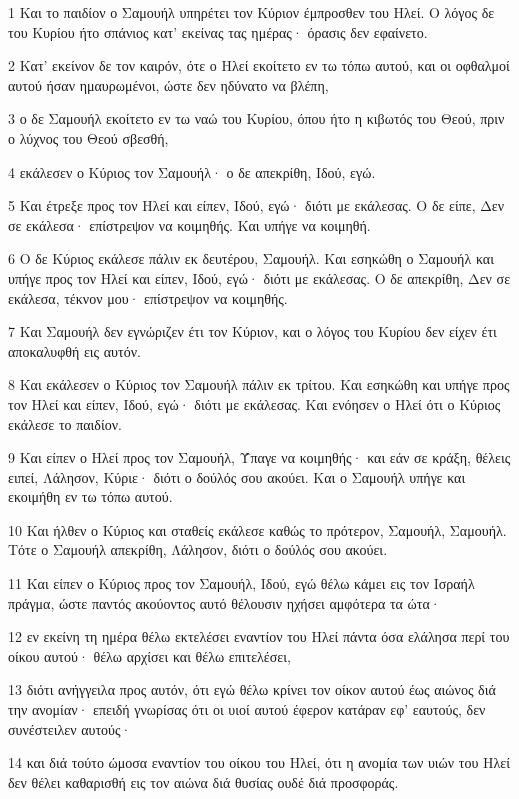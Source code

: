 \par 1 Και το παιδίον ο Σαμουήλ υπηρέτει τον Κύριον έμπροσθεν του Ηλεί. Ο λόγος δε του Κυρίου ήτο σπάνιος κατ' εκείνας τας ημέρας· όρασις δεν εφαίνετο.
\par 2 Κατ' εκείνον δε τον καιρόν, ότε ο Ηλεί εκοίτετο εν τω τόπω αυτού, και οι οφθαλμοί αυτού ήσαν ημαυρωμένοι, ώστε δεν ηδύνατο να βλέπη,
\par 3 ο δε Σαμουήλ εκοίτετο εν τω ναώ του Κυρίου, όπου ήτο η κιβωτός του Θεού, πριν ο λύχνος του Θεού σβεσθή,
\par 4 εκάλεσεν ο Κύριος τον Σαμουήλ· ο δε απεκρίθη, Ιδού, εγώ.
\par 5 Και έτρεξε προς τον Ηλεί και είπεν, Ιδού, εγώ· διότι με εκάλεσας. Ο δε είπε, Δεν σε εκάλεσα· επίστρεψον να κοιμηθής. Και υπήγε να κοιμηθή.
\par 6 Ο δε Κύριος εκάλεσε πάλιν εκ δευτέρου, Σαμουήλ. Και εσηκώθη ο Σαμουήλ και υπήγε προς τον Ηλεί και είπεν, Ιδού, εγώ· διότι με εκάλεσας. Ο δε απεκρίθη, Δεν σε εκάλεσα, τέκνον μου· επίστρεψον να κοιμηθής.
\par 7 Και Σαμουήλ δεν εγνώριζεν έτι τον Κύριον, και ο λόγος του Κυρίου δεν είχεν έτι αποκαλυφθή εις αυτόν.
\par 8 Και εκάλεσεν ο Κύριος τον Σαμουήλ πάλιν εκ τρίτου. Και εσηκώθη και υπήγε προς τον Ηλεί και είπεν, Ιδού, εγώ· διότι με εκάλεσας. Και ενόησεν ο Ηλεί ότι ο Κύριος εκάλεσε το παιδίον.
\par 9 Και είπεν ο Ηλεί προς τον Σαμουήλ, Ύπαγε να κοιμηθής· και εάν σε κράξη, θέλεις ειπεί, Λάλησον, Κύριε· διότι ο δούλός σου ακούει. Και ο Σαμουήλ υπήγε και εκοιμήθη εν τω τόπω αυτού.
\par 10 Και ήλθεν ο Κύριος και σταθείς εκάλεσε καθώς το πρότερον, Σαμουήλ, Σαμουήλ. Τότε ο Σαμουήλ απεκρίθη, Λάλησον, διότι ο δούλός σου ακούει.
\par 11 Και είπεν ο Κύριος προς τον Σαμουήλ, Ιδού, εγώ θέλω κάμει εις τον Ισραήλ πράγμα, ώστε παντός ακούοντος αυτό θέλουσιν ηχήσει αμφότερα τα ώτα·
\par 12 εν εκείνη τη ημέρα θέλω εκτελέσει εναντίον του Ηλεί πάντα όσα ελάλησα περί του οίκου αυτού· θέλω αρχίσει και θέλω επιτελέσει,
\par 13 διότι ανήγγειλα προς αυτόν, ότι εγώ θέλω κρίνει τον οίκον αυτού έως αιώνος διά την ανομίαν· επειδή γνωρίσας ότι οι υιοί αυτού έφερον κατάραν εφ' εαυτούς, δεν συνέστειλεν αυτούς·
\par 14 και διά τούτο ώμοσα εναντίον του οίκου του Ηλεί, ότι η ανομία των υιών του Ηλεί δεν θέλει καθαρισθή εις τον αιώνα διά θυσίας ουδέ διά προσφοράς.
